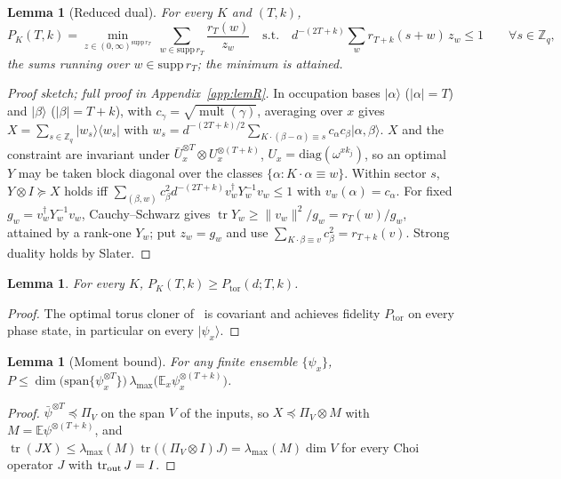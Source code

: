 \documentclass[11pt]{article}
\newcommand{\Z}{\mathbb{Z}}
\newcommand{\E}{\mathbb{E}}
\newcommand{\tr}{\operatorname{tr}}
\newcommand{\mult}{\operatorname{mult}}
\newcommand{\Ptor}{P_{\mathrm{tor}}}
\newcommand{\ket}[1]{\lvert #1\rangle}
\newcommand{\bra}[1]{\langle #1\rvert}
\newtheorem{lemma}[theorem]{Lemma}
\theoremstyle{definition}
\theoremstyle{remark}
\begin{document}
\begin{lemma}[Reduced dual]\label{lem:R}
For every $K$ and $(T,k)$,
\[
P_K(T,k)=\min_{z\in(0,\infty)^{\mathrm{supp}\,r_T}}\ \sum_{w\in\mathrm{supp}\,r_T}\frac{r_T(w)}{z_w}\quad\text{s.t.}\quad d^{-(2T+k)}\sum_{w} r_{T+k}(s+w)\,z_w\le1\qquad\forall s\in\Z_q ,
\]
the sums running over $w\in\mathrm{supp}\,r_T$; the minimum is attained.
\end{lemma}
\begin{proof}[Proof sketch; full proof in Appendix~\ref{app:lemR}]
In occupation bases $\ket\alpha$ ($|\alpha|=T$) and $\ket\beta$ ($|\beta|=T+k$), with $c_\gamma=\sqrt{\mult(\gamma)}$,
averaging over $x$ gives $X=\sum_{s\in\Z_q}\ket{w_s}\bra{w_s}$ with
$w_s=d^{-(2T+k)/2}\sum_{K\cdot(\beta-\alpha)\equiv s}c_\alpha c_\beta\ket{\alpha,\beta}$. $X$ and the constraint are
invariant under $\bar U_x^{\otimes T}\otimes U_x^{\otimes(T+k)}$, $U_x=\mathrm{diag}(\omega^{xk_j})$, so an optimal $Y$
may be taken block diagonal over the classes $\{\alpha:K\cdot\alpha\equiv w\}$. Within sector $s$, $Y\otimes I\succeq X$
holds iff $\sum_{(\beta,w)}c_\beta^2 d^{-(2T+k)}v_w^\dagger Y_w^{-1}v_w\le1$ with $v_w(\alpha)=c_\alpha$. For fixed
$g_w=v_w^\dagger Y_w^{-1}v_w$, Cauchy--Schwarz gives $\tr Y_w\ge\lVert v_w\rVert^2/g_w=r_T(w)/g_w$, attained by a rank-one
$Y_w$; put $z_w=g_w$ and use $\sum_{K\cdot\beta\equiv v}c_\beta^2=r_{T+k}(v)$. Strong duality holds by Slater.
\end{proof}

\begin{lemma}\label{lem:lower}
For every $K$, $P_K(T,k)\ge\Ptor(d;T,k)$.
\end{lemma}
\begin{proof}
The optimal torus cloner of~\cite{Herasymenko2026} is covariant and achieves fidelity $\Ptor$ on every phase state, in
particular on every $\ket{\psi_x}$.
\end{proof}

\begin{lemma}[Moment bound]\label{lem:B}
For any finite ensemble $\{\psi_x\}$, $P\le \dim\big(\mathrm{span}\{\psi_x^{\otimes T}\}\big)\,\lambda_{\max}\big(\E_x\psi_x^{\otimes(T+k)}\big)$.
\end{lemma}
\begin{proof}
$\bar\psi^{\otimes T}\preceq\Pi_V$ on the span $V$ of the inputs, so $X\preceq\Pi_V\otimes M$ with
$M=\E\psi^{\otimes(T+k)}$, and $\tr(JX)\le\lambda_{\max}(M)\tr\big((\Pi_V\otimes I)J\big)=\lambda_{\max}(M)\dim V$ for every Choi
operator $J$ with $\tr_{\rm out}J=I$.
\end{proof}
\end{document}
